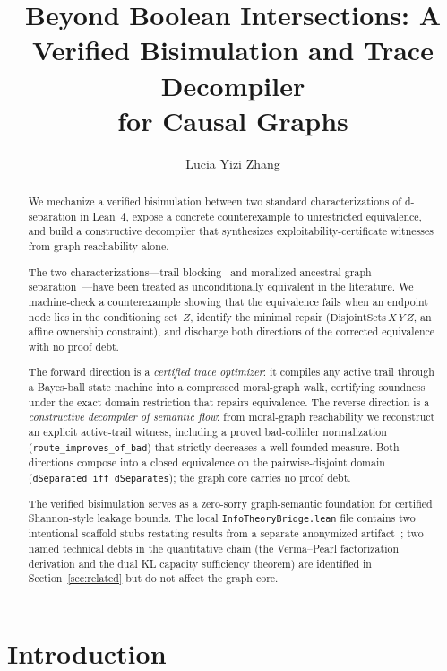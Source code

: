 \documentclass[acmsmall,screen,nonacm]{acmart}
\title{Beyond Boolean Intersections: A Verified Bisimulation and Trace Decompiler\\for Causal Graphs}
\author{Lucia Yizi Zhang}
\affiliation{%
  \institution{Shanghai Lixin University of Accounting and Finance}
  \country{China}
}
\newcommand{\lean}[1]{\lstinline!#1!}
\begin{document}
\begin{abstract}
We mechanize a verified bisimulation between two standard characterizations of
d-separation in Lean~4, expose a concrete counterexample to unrestricted
equivalence, and build a constructive decompiler that synthesizes
exploitability-certificate witnesses from graph reachability alone.

The two characterizations---trail blocking~\cite{pearl2009causality} and
moralized ancestral-graph separation~\cite{lauritzen1996graphical}---have been
treated as unconditionally equivalent in the literature.  We machine-check a
counterexample showing that the equivalence fails when an endpoint node lies in
the conditioning set~$Z$, identify the minimal repair
($\text{DisjointSets}\,X\,Y\,Z$, an affine ownership constraint), and discharge
both directions of the corrected equivalence with no proof debt.

The forward direction is a \emph{certified trace optimizer}: it compiles any
active trail through a Bayes-ball state machine into a compressed moral-graph
walk, certifying soundness under the exact domain restriction that repairs
equivalence.  The reverse direction is a \emph{constructive decompiler of
semantic flow}: from moral-graph reachability we reconstruct an explicit
active-trail witness, including a proved bad-collider normalization
(\lean{route_improves_of_bad}) that strictly decreases a well-founded
measure.  Both directions compose into a closed equivalence on the
pairwise-disjoint domain (\lean{dSeparated_iff_dSeparates}); the graph core
carries no proof debt.

The verified bisimulation serves as a zero-sorry graph-semantic foundation for
certified Shannon-style leakage bounds.  The local
\lean{InfoTheoryBridge.lean} file contains two intentional scaffold stubs
restating results from a separate anonymized artifact~\cite{companionqif};
two named technical debts in the quantitative chain (the Verma--Pearl
factorization derivation and the dual KL capacity sufficiency theorem) are
identified in Section~\ref{sec:related} but do not affect the graph core.
\end{abstract}
\maketitle

\section{Introduction}\label{sec:intro}
\end{document}

